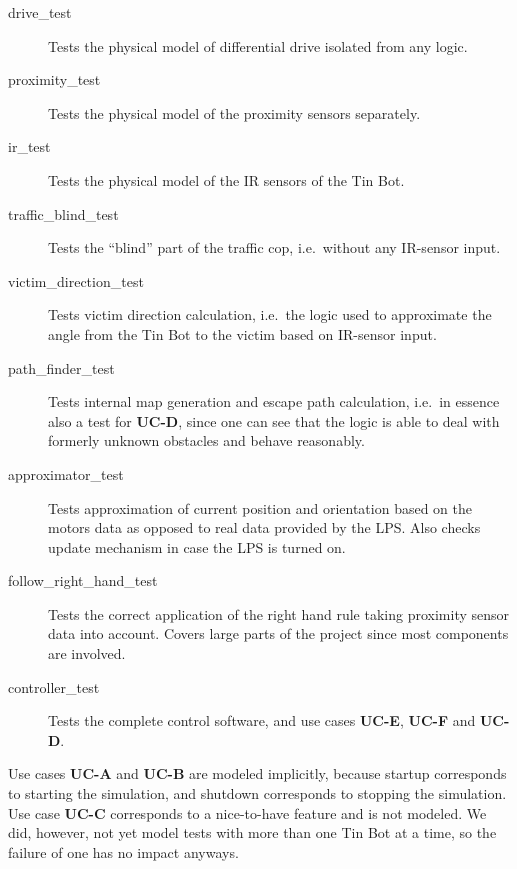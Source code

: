 \documentclass[a4paper,parskip,headheight=38pt]{scrartcl} %
\begin{document}
\begin{description}
\item[drive\_test] Tests the physical model of differential drive isolated from any logic.
\item[proximity\_test] Tests the physical model of the proximity sensors separately. %
\item[ir\_test] Tests the physical model of the IR sensors of the Tin Bot.
\item[traffic\_blind\_test] Tests the \enquote{blind} part of the traffic cop, i.e.\ without any IR-sensor input.
\item[victim\_direction\_test] Tests victim direction calculation, i.e.\ the logic used to approximate the angle from the Tin Bot to the victim based on IR-sensor input.
\item[path\_finder\_test] Tests internal map generation and escape path calculation, i.e.\ in essence also a test for \textbf{UC-D}, since one can see that the logic is able to deal with formerly unknown obstacles and behave reasonably.
\item[approximator\_test] Tests approximation of current position and orientation based on the motors data as opposed to real data provided by the LPS. Also checks update mechanism in case the LPS is turned on.
\item[follow\_right\_hand\_test] Tests the correct application of the right hand rule taking proximity sensor data into account. Covers large parts of the project since most components are involved.
\item[controller\_test] Tests the complete control software, and use cases \textbf{UC-E}, \textbf{UC-F} and \textbf{UC-D}.
\end{description}


Use cases \textbf{UC-A} and \textbf{UC-B} are modeled implicitly, because startup corresponds to starting the simulation, and shutdown corresponds to stopping the simulation.
Use case \textbf{UC-C} corresponds to a nice-to-have feature and is not modeled. We did, however, not yet model tests with more than one Tin Bot at a time, so the failure of one has no impact anyways.
\end{document}
